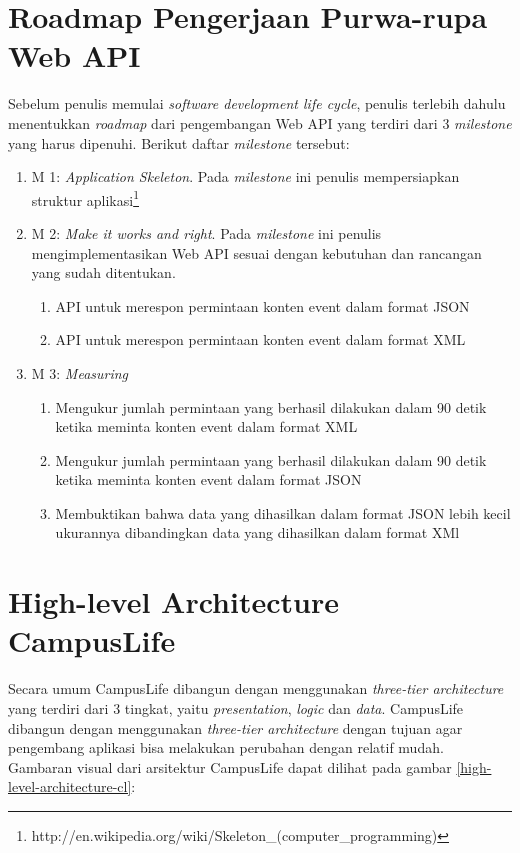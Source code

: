 \documentclass[a4paper, 12pt, oneside]{report}
\begin{document}
\section{Roadmap Pengerjaan Purwa-rupa Web API}
\onehalfspacing Sebelum penulis memulai \textit{software development life cycle}, penulis terlebih dahulu menentukkan \textit{roadmap} dari pengembangan Web API yang terdiri dari 3 \textit{milestone} yang harus dipenuhi. Berikut daftar \textit{milestone} tersebut:
\begin{enumerate}
  \item M 1: \textit{Application Skeleton}. Pada \textit{milestone} ini penulis mempersiapkan struktur aplikasi\footnote{http://en.wikipedia.org/wiki/Skeleton\_(computer\_programming)}
  \item M 2: \textit{Make it works and right}. Pada \textit{milestone} ini penulis mengimplementasikan Web API sesuai dengan kebutuhan dan rancangan yang sudah ditentukan.
  \begin{enumerate}
    \item API untuk merespon permintaan konten event dalam format JSON
    \item API untuk merespon permintaan konten event dalam format XML
  \end{enumerate}
  \item M 3: \textit{Measuring}
    \begin{enumerate}
      \item Mengukur jumlah permintaan yang berhasil dilakukan dalam 90 detik ketika meminta konten event dalam format XML
      \item Mengukur jumlah permintaan yang berhasil dilakukan dalam 90 detik ketika meminta konten event dalam format JSON
      \item Membuktikan bahwa data yang dihasilkan dalam format JSON lebih kecil ukurannya dibandingkan data yang dihasilkan dalam format XMl
    \end{enumerate}
\end{enumerate}

\section{High-level Architecture CampusLife}
\onehalfspacing Secara umum CampusLife dibangun dengan menggunakan \textit{three-tier architecture} yang terdiri dari 3 tingkat, yaitu \textit{presentation}, \textit{logic} dan \textit{data}. CampusLife dibangun dengan menggunakan \textit{three-tier architecture} dengan tujuan agar pengembang aplikasi bisa melakukan perubahan dengan relatif mudah. Gambaran visual dari arsitektur CampusLife dapat dilihat pada gambar \ref{high-level-architecture-cl}:
\end{document}
